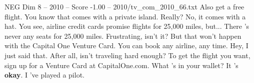 \begin{textsample}{NEG Dim 8 – 2010 – Score -1.00 – 2010/tv\_com\_2010\_66.txt}  \label{ex:f8_neg_045}
Also get a free flight.
You know that comes with a private island.
Really?
No, it comes with a hat.
You see, airline credit cards promise flights for 25,000 miles, but...
There 's never any seats for 25,000 miles.
Frustrating, isn't it?
But that won't happen with the Capital One Venture Card.
You can book any airline, any time.
Hey, I just said that.
After all, isn't traveling hard enough?
To get the flight you want, sign up for a Venture Card at CapitalOne.com.
What 's in your wallet?
It 's \textbf{okay}.
I 've played a pilot.

\end{textsample}
